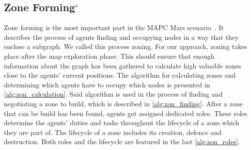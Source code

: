 \subsection[Zone Forming]{Zone Forming$^\circ$}
Zone forming is the most important part in the MAPC Mars scenario~\cite{ahlbrecht_mapc_2014}.%
It describes the process of agents finding and occupying nodes in a way that they enclose a subgraph.
We called this process zoning.
For our approach, zoning takes place after the map exploration phase.
This should ensure that enough information about the graph has been gathered to calculate high valuable zones close to the agents' current positions.
The algorithm for calculating zones and determining which agents have to occupy which nodes is presented in \autoref{alg:zon_calculation}.
Said algorithm is used in the process of finding and negotiating a zone to build, which is described in \autoref{alg:zon_finding}.
After a zone that can be build has been found, agents get assigned dedicated roles.
These roles determine the agents' duties and tasks throughout the lifecycle of a zone which they are part of.
The lifecycle of a zone includes its creation, defence and destruction.
Both roles and the lifecycle are featured in the last \autoref{alg:zon_roles}.




